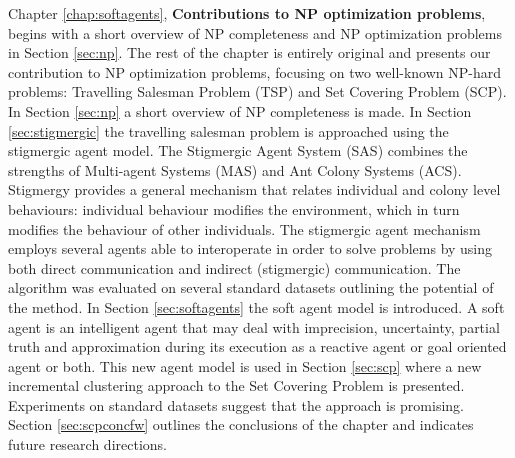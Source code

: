 Chapter \ref{chap:softagents}, \textbf{Contributions to NP optimization problems}, begins with a short overview of NP completeness and NP optimization problems in Section \ref{sec:np}. The rest of the chapter is entirely original and presents our contribution to NP optimization problems, focusing on two  well-known NP-hard problems: Travelling Salesman Problem (TSP) and Set Covering Problem (SCP). In Section \ref{sec:np} a short overview of NP completeness is made. In Section \ref{sec:stigmergic} the travelling salesman problem is approached using the stigmergic agent model. The Stigmergic Agent System (SAS) combines the strengths of Multi-agent Systems (MAS) and Ant Colony Systems (ACS).  Stigmergy provides a general mechanism that relates individual and colony level behaviours: individual behaviour modifies the environment, which in turn modifies the behaviour of other individuals. The stigmergic agent mechanism employs several agents able to interoperate in order to solve problems by using both direct communication and indirect (stigmergic) communication. The algorithm was evaluated on several standard datasets outlining the potential of the method. 
In Section \ref{sec:softagents} the soft agent model is introduced. A soft agent is an intelligent agent that may  deal with imprecision, uncertainty, partial truth and approximation during its execution as a reactive agent or goal oriented agent or both. This new agent model is used in Section \ref{sec:scp} where a new incremental clustering approach to the Set Covering Problem is presented. Experiments on standard datasets suggest that the approach is promising. Section \ref{sec:scpconcfw} outlines the conclusions of the chapter and indicates future research directions.


